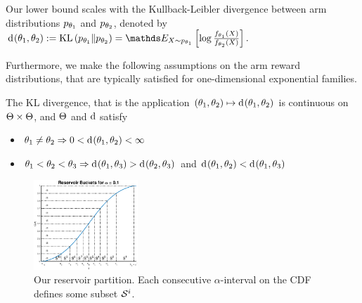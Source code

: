 Our lower bound scales with the Kullback-Leibler divergence between arm
distributions $p_{\theta_1}$ and $p_{\theta_2}$, denoted by
$
\ArmKL{\expReward_1}{\expReward_2} := \KL{p_{\expReward_1}}{p_{\expReward_2}}
	= \ENone_{X \sim p_{\expReward_1}}\left[\log \frac{f_{\expReward_1}(X)}{f_{\expReward_2}(X)}\right].
$

Furthermore, we make the following assumptions on the arm reward distributions,
that are typically satisfied for one-dimensional exponential families.
\begin{assumption}\label{ass:kldiv}
The KL divergence, that is the application
$(\theta_1,\theta_2) \mapsto \operatorname{d}\hspace{-.1em}\left( \theta_1, \theta_2 \right)$
is continuous on $\Theta \times \Theta$,
and $\Theta$ and $\operatorname{d}$ satisfy 
\begin{itemize}[topsep=0pt,itemsep=0pt]
\item $\theta_1 \ne \theta_2 \Rightarrow
    0 < \operatorname{d}\hspace{-.1em}\left( \theta_1, \theta_2 \right) < \infty$
\item $\theta_1 < \theta_2 < \theta_3 \Rightarrow
    \operatorname{d}\hspace{-.1em}\left( \theta_1, \theta_3 \right) >  
    \operatorname{d}\hspace{-.1em}\left( \theta_2, \theta_3 \right)$
    and $\operatorname{d}\hspace{-.1em}\left( \theta_1, \theta_2 \right) <  
    \operatorname{d}\hspace{-.1em}\left( \theta_1, \theta_3 \right)$
\end{itemize}
\end{assumption}
 
\begin{figure}
	\vspace{-20pt}
	\includegraphics[width=0.35\textwidth]{fixedconfidence/figures/lb_buckets}
	\caption{Our reservoir partition.
		Each consecutive $\alpha$-interval on the CDF defines some
		subset $\mathcal{S}^{i}$.}
	\label{fig-lb-buckets}
	\vspace{-30pt}
\end{figure}

